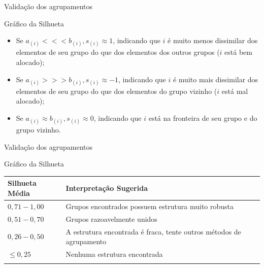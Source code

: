 \documentclass[
  ignorenonframetext,
  aspectratio=169,
]{beamer}
\newcounter{none} %
\begin{document}
\begin{frame}{Validação dos agrupamentos}
\protect{}\label{validauxe7uxe3o-dos-agrupamentos-8}
\begin{block}{Gráfico da Silhueta}
\protect{}\label{gruxe1fico-da-silhueta-2}
\begin{itemize}
\item
  Se \(a_{(i)} <<< b_{(i)}, s_{(i)} \approx 1\), indicando que \(i\) é
  muito menos dissimilar dos elementos de seu grupo do que dos elementos
  dos outros grupos (\(i\) está bem alocado);
\item
  Se \(a_{(i)} >>> b_{(i)}, s_{(i)} \approx −1\), indicando que \(i\) é
  muito mais dissimilar dos elementos de seu grupo do que dos elementos
  do grupo vizinho (\(i\) está mal alocado);
\item
  Se \(a_{(i)} \approx b_{(i)}, s_{(i)} \approx 0\), indicando que \(i\)
  está na fronteira de seu grupo e do grupo vizinho.
\end{itemize}
\end{block}
\end{frame}

\begin{frame}{Validação dos agrupamentos}
\protect{}\label{validauxe7uxe3o-dos-agrupamentos-9}
\begin{block}{Gráfico da Silhueta}
\protect{}\label{gruxe1fico-da-silhueta-3}
{\def\LTcaptype{none} %
\begin{longtable}[]{@{}
  >{\raggedright\arraybackslash}p{}
  >{\raggedright\arraybackslash}p{}@{}}
\toprule\noalign{}
\begin{minipage}[b]{\linewidth}\raggedright
\textbf{Silhueta Média}
\end{minipage} & \begin{minipage}[b]{\linewidth}\raggedright
\textbf{Interpretação Sugerida}
\end{minipage} \\
\midrule\noalign{}
\endhead
\(0{,}71 - 1{,}00\) & Grupos encontrados possuem estrutura muito
robusta \\
\(0{,}51 - 0{,}70\) & Grupos razoavelmente unidos \\
\(0{,}26 - 0{,}50\) & A estrutura encontrada é fraca, tente outros
métodos de agrupamento \\
\(\leqslant 0{,}25\) & Nenhuma estrutura encontrada \\
\bottomrule\noalign{}
\end{longtable}
}
\end{block}
\end{frame}
\end{document}
